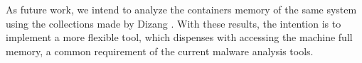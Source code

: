\documentclass[conference]{IEEEtran}
\newcommand{\marcosR}[1]{{\color{brown}{COMMENT: #1}}}
\newcommand{\fancyname}{Dizang }
\begin{document}
As future work, we intend to analyze the containers memory of the same system using the collections made by \fancyname. 
%
With these results, the intention is to implement a more flexible tool, which dispenses with accessing the machine full memory, a common requirement of the current malware analysis tools. %



%
%
%






\end{document}

